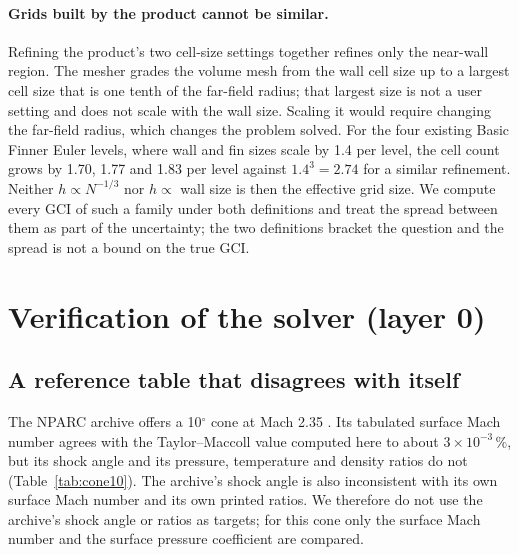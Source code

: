 \documentclass[11pt,a4paper]{article}
\begin{document}
\paragraph{Grids built by the product cannot be similar.}
Refining the product's two cell-size settings together refines only the near-wall region.
The mesher grades the volume mesh from the wall cell size up to a largest cell size that is one tenth of the
far-field radius; that largest size is not a user setting and does not scale with the wall size.
Scaling it would require changing the far-field radius, which changes the problem solved.
For the four existing Basic Finner Euler levels, where wall and fin sizes scale by 1.4 per level, the cell count
grows by 1.70, 1.77 and 1.83 per level against $1.4^3=2.74$ for a similar refinement.
Neither $h\propto N^{-1/3}$ nor $h\propto$ wall size is then the effective grid size.
We compute every GCI of such a family under both definitions and treat the spread between them as part of the
uncertainty; the two definitions bracket the question and the spread is not a bound on the true GCI.

\section{Verification of the solver (layer 0)}
\label{sec:verification}

\subsection{A reference table that disagrees with itself}
\label{sec:cone10}

The NPARC archive offers a 10$^\circ$ cone at Mach 2.35 \citep{nparc_cone10}.
Its tabulated surface Mach number agrees with the Taylor--Maccoll value computed here to about $3\times10^{-3}\,\%$,
but its shock angle and its pressure, temperature and density ratios do not (Table~\ref{tab:cone10}).
The archive's shock angle is also inconsistent with its own surface Mach number and its own printed ratios.
We therefore do not use the archive's shock angle or ratios as targets; for this cone only the surface Mach number
and the surface pressure coefficient are compared.
\end{document}
